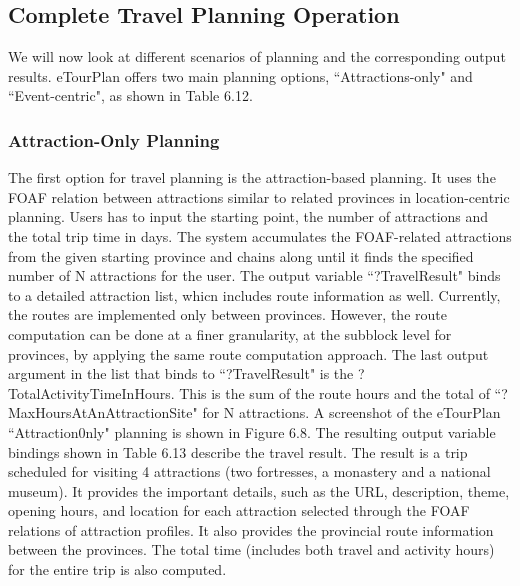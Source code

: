 \subsection{Complete Travel Planning Operation}
 
\hspace{0.3in} We will now look at different scenarios of planning and the corresponding output results. eTourPlan offers two main planning options, ``Attractions-only" and ``Event-centric", as shown in Table 6.12. 
\subsubsection{Attraction-Only Planning}
\hspace{0.3in}The first option for travel planning is the attraction-based planning. It uses the FOAF relation between attractions similar to related provinces in location-centric planning. Users has to input the starting point, the number of attractions and the total trip time in days. The system accumulates the FOAF-related attractions from the given starting province and chains along until it finds the specified number of N attractions for the user.
The output variable ``?TravelResult" binds to a detailed attraction list, whicn includes route
information as well. Currently, the routes are implemented only between provinces. However, the route computation can be done at a finer granularity, at the subblock level for provinces, by applying the same route computation approach. The last output argument in the list that binds to ``?TravelResult" is the ?TotalActivityTimeInHours. This is the sum of the route hours and the total of ``?MaxHoursAtAnAttractionSite" for N attractions. A screenshot of the eTourPlan ``Attraction0nly" planning 
is shown in Figure 6.8. The resulting output variable bindings shown in Table 6.13 describe the travel result. The result is a trip scheduled for visiting 4 attractions (two fortresses, a monastery and a national museum). It provides the important details, such as the URL, description, theme, opening hours, and location for each attraction selected through the FOAF relations of attraction profiles. It also provides the provincial route information between the provinces. The total time (includes both travel and activity hours) for the entire trip is also computed.

